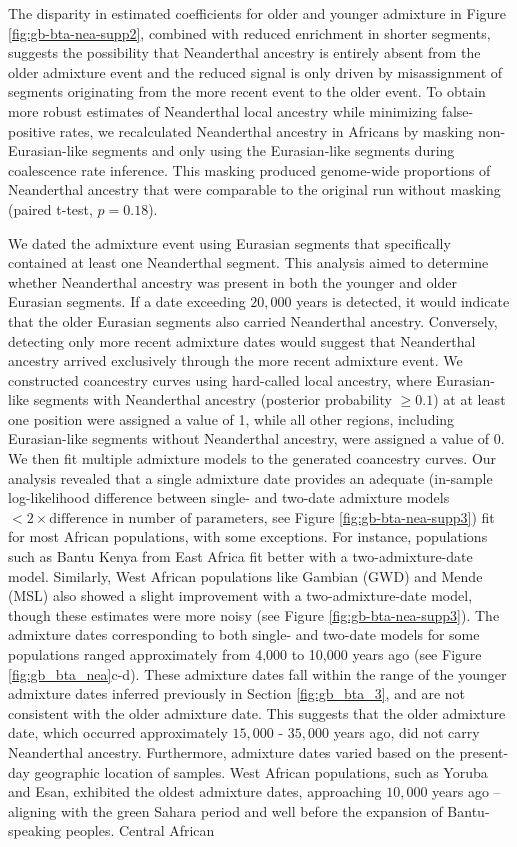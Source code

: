 The disparity in estimated coefficients for older and younger admixture in Figure \ref{fig:gb-bta-nea-supp2}, combined with reduced enrichment in shorter segments, suggests the possibility that Neanderthal ancestry is entirely absent from the older admixture event and the reduced signal is only driven by misassignment of segments originating from the more recent event to the older event. To obtain more robust estimates of Neanderthal local ancestry while minimizing false-positive rates, we recalculated Neanderthal ancestry in Africans by masking non-Eurasian-like segments and only using the Eurasian-like segments during coalescence rate inference. This masking produced genome-wide proportions of Neanderthal ancestry that were comparable to the original run without masking (paired t-test, $p=0.18$).

We dated the admixture event using Eurasian segments that specifically contained at least one Neanderthal segment. This analysis aimed to determine whether Neanderthal ancestry was present in both the younger and older Eurasian segments. If a date exceeding $20{,}000$ years is detected, it would indicate that the older Eurasian segments also carried Neanderthal ancestry. Conversely, detecting only more recent admixture dates would suggest that Neanderthal ancestry arrived exclusively through the more recent admixture event. We constructed coancestry curves using hard-called local ancestry, where Eurasian-like segments with Neanderthal ancestry (posterior probability $\geq 0.1$) at at least one position were assigned a value of 1, while all other regions, including Eurasian-like segments without Neanderthal ancestry, were assigned a value of 0. We then fit multiple admixture models to the generated coancestry curves. Our analysis revealed that a single admixture date provides an adequate (in-sample log-likelihood difference between single- and two-date admixture models $< 2 \times \text{difference in number of parameters}$, see Figure \ref{fig:gb-bta-nea-supp3}) fit for most African populations, with some exceptions. For instance, populations such as Bantu Kenya from East Africa fit better with a two-admixture-date model. Similarly, West African populations like Gambian (GWD) and Mende (MSL) also showed a slight improvement with a two-admixture-date model, though these estimates were more noisy (see Figure \ref{fig:gb-bta-nea-supp3}). The admixture dates corresponding to both single- and two-date models for some populations ranged approximately from 4,000 to 10,000 years ago (see Figure \ref{fig:gb_bta_nea}c-d). These admixture dates fall within the range of the younger admixture dates inferred previously in Section \ref{fig:gb_bta_3}, and are not consistent with the older admixture date. This suggests that the older admixture date, which occurred approximately $15{,}000$ - $35{,}000$ years ago, did not carry Neanderthal ancestry. Furthermore, admixture dates varied based on the present-day geographic location of samples. West African populations, such as Yoruba and Esan, exhibited the oldest admixture dates, approaching $10{,}000$ years ago -- aligning with the green Sahara period \cite{tierney2017rainfall, larrasoana2013dynamics} and well before the expansion of Bantu-speaking peoples. Central African 